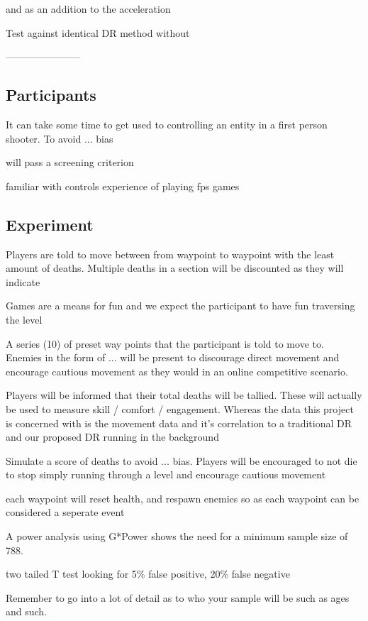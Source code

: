 \documentclass[journal]{IEEEtran}
\begin{document}
and as an addition to the acceleration

Test against identical DR method without

-----------------------

\subsection{Participants}

It can take some time to get used to controlling an entity in a first person shooter. To avoid ... bias

will pass a screening criterion

familiar with controls
experience of playing fps games

\subsection{Experiment}

Players are told to move between from waypoint to waypoint with the least amount of deaths. Multiple deaths in a section will be discounted as they will indicate 

Games are a means for fun and we expect the participant to have fun traversing the level

A series (10) of preset way points that the participant is told to move to. Enemies in the form of ... will be present to discourage direct movement and encourage cautious movement as they would in an online competitive scenario.

Players will be informed that their total deaths will be tallied. These will actually be used to measure skill / comfort / engagement. Whereas the data this project is concerned with is the movement data and it's correlation to a traditional DR and our proposed DR running in the background

Simulate a score of deaths to avoid ... bias. Players will be encouraged to not die to stop simply running through a level and encourage cautious movement

each waypoint will reset health, and respawn enemies so as each waypoint can be considered a seperate event

A power analysis using G*Power shows the need for a minimum sample size of 788.

two tailed T test looking for 5\% false positive, 20\% false negative



Remember to go into a lot of detail as to who your sample will be such as ages and such.
\end{document}
